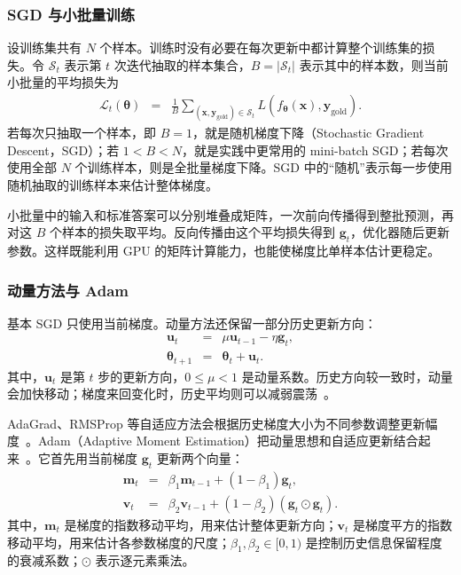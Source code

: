 \subsubsection{SGD 与小批量训练}

设训练集共有 $N$ 个样本。训练时没有必要在每次更新中都计算整个训练集的损失。令 $\mathcal{S}_t$ 表示第 $t$ 次迭代抽取的样本集合，$B=|\mathcal{S}_t|$ 表示其中的样本数，则当前小批量的平均损失为
\begin{eqnarray}
\mathcal{L}_t(\boldsymbol{\theta})
& = &
\frac{1}{B}
\sum_{(\mathbf{x},\mathbf{y}_{\mathrm{gold}})\in\mathcal{S}_t}
L\!\left(
f_{\boldsymbol{\theta}}(\mathbf{x}),
\mathbf{y}_{\mathrm{gold}}
\right).
\end{eqnarray}
若每次只抽取一个样本，即 $B=1$，就是随机梯度下降（Stochastic Gradient Descent，SGD）；若 $1<B<N$，就是实践中更常用的 mini-batch SGD；若每次使用全部 $N$ 个训练样本，则是全批量梯度下降。SGD 中的“随机”表示每一步使用随机抽取的训练样本来估计整体梯度。

小批量中的输入和标准答案可以分别堆叠成矩阵，一次前向传播得到整批预测，再对这 $B$ 个样本的损失取平均。反向传播由这个平均损失得到 $\mathbf{g}_t$，优化器随后更新参数。这样既能利用 GPU 的矩阵计算能力，也能使梯度比单样本估计更稳定。

\subsubsection{动量方法与 Adam}

基本 SGD 只使用当前梯度。动量方法还保留一部分历史更新方向：
\begin{eqnarray}
\mathbf{u}_t
& = &
\mu\mathbf{u}_{t-1}-\eta\mathbf{g}_t,\\
\boldsymbol{\theta}_{t+1}
& = &
\boldsymbol{\theta}_t+\mathbf{u}_t.
\end{eqnarray}
其中，$\mathbf{u}_t$ 是第 $t$ 步的更新方向，$0\leq\mu<1$ 是动量系数。历史方向较一致时，动量会加快移动；梯度来回变化时，历史平均则可以减弱震荡~\cite{SutskeverEtAl2013Momentum}。

AdaGrad、RMSProp 等自适应方法会根据历史梯度大小为不同参数调整更新幅度~\cite{duchi-etal:2011adaptive,Hinton:2018RMSProp}。Adam（Adaptive Moment Estimation）把动量思想和自适应更新结合起来~\cite{KingmaBa2015Adam}。它首先用当前梯度 $\mathbf{g}_t$ 更新两个向量：
\begin{eqnarray}
\mathbf{m}_t
& = &
\beta_1\mathbf{m}_{t-1}
+(1-\beta_1)\mathbf{g}_t,\\
\mathbf{v}_t
& = &
\beta_2\mathbf{v}_{t-1}
+(1-\beta_2)
(\mathbf{g}_t\odot\mathbf{g}_t).
\end{eqnarray}
其中，$\mathbf{m}_t$ 是梯度的指数移动平均，用来估计整体更新方向；$\mathbf{v}_t$ 是梯度平方的指数移动平均，用来估计各参数梯度的尺度；$\beta_1,\beta_2\in[0,1)$ 是控制历史信息保留程度的衰减系数；$\odot$ 表示逐元素乘法。

